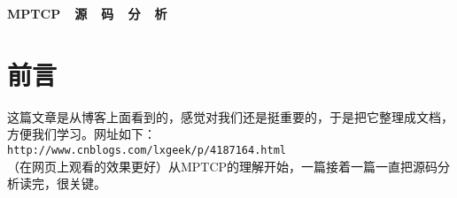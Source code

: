 \documentclass[a4paper,10pt]{ctexart}
\begin{document}
\pagestyle{empty}

\begin{center}
\Huge\textbf{MPTCP~~源~~码~~分~~析}
\end{center}

\tableofcontents

\section{前言}
这篇文章是从博客上面看到的，感觉对我们还是挺重要的，于是把它整理成文档，方便我们学习。网址如下：\\
\verb|http://www.cnblogs.com/lxgeek/p/4187164.html|\\
（在网页上观看的效果更好）从MPTCP的理解开始，一篇接着一篇一直把源码分析读完，很关键。

{\color{red}{说明：红色部分是我添加的注解}}


\newpage

\newpage

\newpage

\newpage

\newpage

\newpage

\newpage




\end{document}
